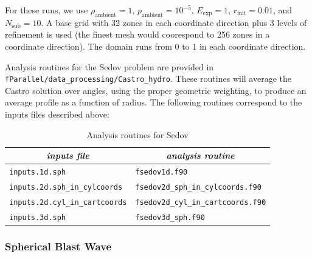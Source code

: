 For these runs, we use $\rho_\mathrm{ambient} = 1$,
$p_\mathrm{ambient} = 10^{-5}$, $E_\mathrm{exp} = 1$, $r_\mathrm{init}
 = 0.01$, and $N_\mathrm{sub} = 10$.  A base grid with 32 zones in each
coordinate direction plus 3 levels of refinement is used (the finest
mesh would coorespond to 256 zones in a coordinate direction).  The
domain runs from 0 to 1 in each coordinate direction.




Analysis routines for the Sedov problem are provided in {\tt
  fParallel/data\_processing/Castro\_hydro}.  These routines will
average the Castro solution over angles, using the proper geometric
weighting, to produce an average profile as a function of radius.
The following routines correspond to the inputs files described above:
\begin{table}[h]
\centering
{\small
\begin{tabular}{|l|l|} \hline
\multicolumn{1}{|c}{\em inputs file} &  \multicolumn{1}{|c|}{\em analysis routine} \\
\hline
{\tt inputs.1d.sph} & {\tt fsedov1d.f90} \\
%
{\tt inputs.2d.sph\_in\_cylcoords} & {\tt fsedov2d\_sph\_in\_cylcoords.f90} \\
%
{\tt inputs.2d.cyl\_in\_cartcoords} & {\tt fsedov2d\_cyl\_in\_cartcoords.f90} \\
%
{\tt inputs.3d.sph} & {\tt fsedov3d\_sph.f90} \\
\hline
\end{tabular}
} %
\caption{\label{table:fsedov} Analysis routines for Sedov}
\end{table}

\subsubsection{Spherical Blast Wave}

